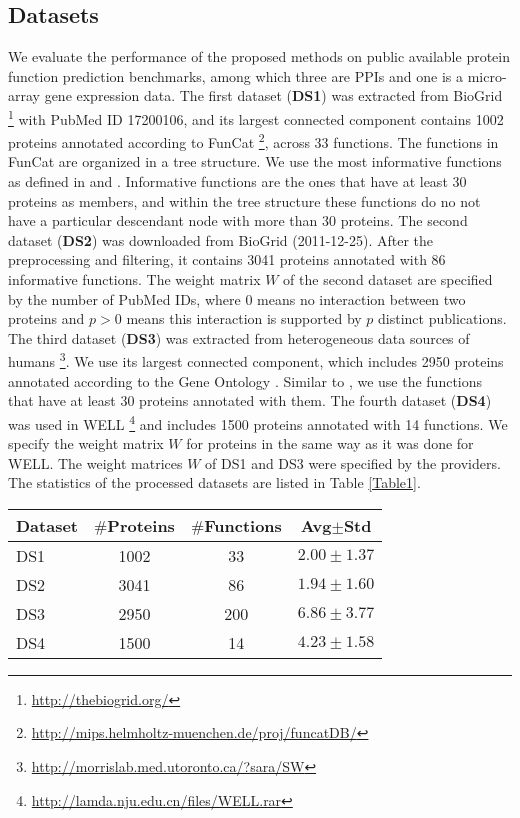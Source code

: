 \documentclass{llncs} %
\begin{document}
\subsection{Datasets}
We evaluate the performance of the proposed methods on public available protein function
prediction benchmarks, among which three are PPIs and one is a micro-array gene expression data. The first dataset (\textbf{DS1}) was
extracted from BioGrid \footnote{\href{http://thebiogrid.org/}{http://thebiogrid.org/}} with PubMed ID 17200106, and its largest connected component contains 1002 proteins annotated according to FunCat \cite{ruepp2004funcat}\footnote{\href{http://mips.helmholtz-muenchen.de/proj/funcatDB/}
{http://mips.helmholtz-muenchen.de/proj/funcatDB/}}, across  33 functions. The functions in FunCat are organized in a tree structure. We use the most informative functions as defined
in  \cite{jiang2011predicting} and \cite{zhang2011framework}.  Informative functions are the ones that have at least 30 proteins as members, and within the tree structure these functions
do no not have a particular descendant node with more than 30 proteins.   The second dataset (\textbf{DS2}) was downloaded from BioGrid (2011-12-25). After the preprocessing and filtering, it contains 3041 proteins annotated with 86 informative functions. The weight matrix $W$ of the second dataset are specified by the number of PubMed IDs, where $0$ means no interaction between two proteins and $p>0$ means this interaction is supported by $p$ distinct publications. The third dataset (\textbf{DS3}) was extracted from heterogeneous data sources of humans \cite{mostafavi2010fast}\footnote{\href{http://morrislab.med.utoronto.ca/?sara/SW}{http://morrislab.med.utoronto.ca/?sara/SW}}. We use its largest connected component, which includes 2950 proteins annotated according to the Gene Ontology \cite{ashburner2000gene}. Similar to \cite{mostafavi2010fast}, we use the functions that have at least 30 proteins annotated with them. The fourth dataset (\textbf{DS4}) was used in WELL \cite{sun2010multi}\footnote{\href{http://lamda.nju.edu.cn/files/WELL.rar}{http://lamda.nju.edu.cn/files/WELL.rar}} and includes 1500 proteins annotated with 14 functions. We specify the weight matrix $W$ for proteins in the same way as it was done for WELL. The weight matrices $W$ of DS1 and DS3 were specified by the providers. The statistics of the processed datasets are listed in Table \ref{Table1}.
\begin{table*}[htb!p]
\scriptsize
\caption{Statistics of datasets (Avg$\pm$Std means average number of functions for each protein and its standard deviation)}
\centering
\begin{tabular}{|l||c|c|c|}
\hline
Dataset& $\#$Proteins& $\#$Functions & Avg$\pm$Std\\
\hline
DS1 & 1002 & 33 & $2.00\pm1.37$\\
DS2 & 3041 & 86 & $1.94\pm1.60$\\
DS3 & 2950 & 200 & $6.86\pm3.77$\\
DS4 & 1500 & 14 & $4.23\pm1.58$\\
\hline
\end{tabular}
\label{Table1}
\end{table*}
\end{document}
